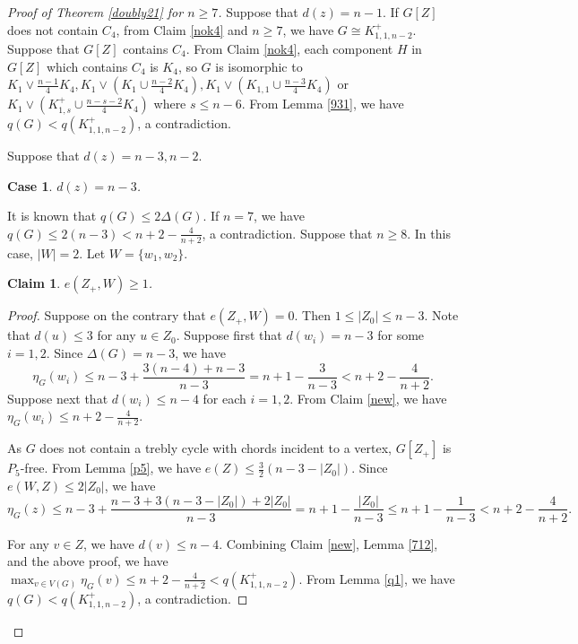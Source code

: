 \documentclass[12pt]{article}
\newtheorem {claim}{Claim}[section]
\newtheorem {case}{Case}
\begin{document}
\begin{proof}[Proof of Theorem \ref{doubly21} for $n\ge 7$]
Suppose that $d(z)=n-1$.
If $G[Z]$ does not contain $C_4$, from Claim \ref{nok4} and $n\ge 7$, we have $G\cong K_{1,1,n-2}^+$.
Suppose that $G[Z]$ contains $C_4$. From Claim \ref{nok4}, each component $H$ in $G[Z]$ which contains $C_4$ is $K_4$, so $G$ is isomorphic to $K_1\vee \frac{n-1}{4}K_4, K_1\vee \left(K_1\cup \frac{n-2}{4}K_4\right), K_1\vee \left(K_{1,1}\cup \frac{n-3}{4}K_4\right)$ or $K_1\vee \left(K_{1,s}^+\cup \frac{n-s-2}{4}K_4\right)$ where $s\le n-6$.
From Lemma \ref{931}, we have $q(G)<q(K_{1,1,n-2}^+)$, a contradiction.

Suppose that $d(z)=n-3, n-2$.

\begin{case}\label{a1}
$d(z)=n-3$.
\end{case}
It is  known that $q(G)\le 2\Delta(G)$.
If $n=7$, we have $q(G)\le 2(n-3)<n+2-\frac{4}{n+2}$, a contradiction.
Suppose that $n\ge 8$.
In this case, $|W|=2$.
Let $W=\{w_1,w_2\}$.

\begin{claim}\label{2221}
$e(Z_+,W)\ge 1$.
\end{claim}

\begin{proof} Suppose on the contrary that $e(Z_+,W)=0$. Then $1\le |Z_0|\le n-3$.
Note that $d(u)\le 3$ for any $u\in Z_0$.
Suppose first that $d(w_i)= n-3$ for some $i=1,2$.
Since $\Delta(G)=n-3$, we have
\[
\eta_{G}(w_i)\le n-3+\frac{3(n-4)+n-3}{n-3}= n+1-\frac{3}{n-3}<n+2-\frac{4}{n+2}.
\]
Suppose next that $d(w_i)\le n-4$ for each $i=1,2$. From Claim \ref{new}, we have $\eta_G(w_i)\le n+2-\frac{4}{n+2}$.

As $G$ does not contain a trebly cycle with chords incident to a vertex, $G[Z_+]$ is $P_5$-free.
From Lemma \ref{p5}, we have $e(Z)\le \frac{3}{2}\left(n-3-|Z_0|\right)$.
Since $e(W,Z)\le 2|Z_0|$, we have
\[
\eta_{G}(z)\le n-3+\frac{n-3+3\left(n-3-|Z_0|\right)+2|Z_0|}{n-3}=n+1-\frac{|Z_0|}{n-3}\le n+1-\frac{1}{n-3}<n+2-\frac{4}{n+2}.
\]

For any $v\in Z$, we have $d(v)\le n-4$. Combining Claim \ref{new}, Lemma \ref{712}, and the above proof, we have
$\max_{v\in V(G)}\eta_{G}(v)\le n+2-\frac{4}{n+2}<q(K_{1,1,n-2}^+)$.
From Lemma \ref{q1}, we have $q(G)<q(K_{1,1,n-2}^+)$, a contradiction.
\end{proof}



\end{proof}
\end{document}
